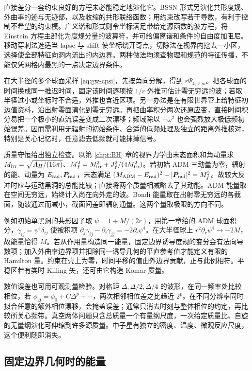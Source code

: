 直接差分一套约束良好的方程未必能稳定地演化它。BSSN 形式另演化共形度规、外曲率的迹与无迹部，以及收缩的共形联络函数；用约束改写若干导数，有利于控制不希望的约束模。广义谐和形式则令坐标满足带给定源函数的波方程，将 Einstein 方程主部化为度规分量的波算符，并可给偏离谐和条件的自由度加阻尼。移动穿刺法选适当 lapse 与 shift 使坐标绕开奇点，切除法在视界内挖去一小区，选择使全部特征向洞内流出的内边界。两种做法均须查物理和规范的特征传播，不能仅凭网格内最黑的一点决定边界条件。

在大半径的多个球面采样 \eqref{eq:gw-cpsi}，先按角向分解，得到 $r\Psi_{4,\ell m}$。把各球面的时间换成同一推迟时间，固定该时间逐项按 $1/r$ 外推可估计零无穷远的波；若取半径过小或坐标时不合适，外推也含近区项。另一办法是在有限世界管上给特征初边值资料，沿出射零面演化到零无穷远。再把曲率积分两次还原应变，直接时间积分易把一个极小的直流误差变成二次漂移；频域除以 $-\omega^2$ 也会强烈放大极低频初始误差。因而需利用无辐射的初始条件、合适的低频处理及独立的距离外推核对，特别是关心记忆时，任意滤去低频就可能抹掉信号。

质量守恒给出独立检查。以第 \ref{chpt:BH} 章的视界力学由末态面积和角动量求 $M_{\rm irr}=\sqrt{A_H/(16\pi)}$、$M_f^2=M_{\rm irr}^2+J_f^2/(4M_{\rm irr}^2)$。若初始 ADM 三动量为零，辐射的能、动量为 $E_{\rm rad},\bm P_{\rm rad}$，末态满足 $(M_{\rm ADM}-E_{\rm rad})^2-|\bm P_{\rm rad}|^2=M_f^2$。故较大反冲时应与运动黑洞的总能比较；直接将两个质量相减略去了其动能。ADM 能量取在空间无穷远，始终计入尚在向外走的波。Bondi 能量取在出射零无穷远的各截面，随波通过而减小，截面间差即辐射通量。这两个量取极限的方向不同。

例如初始单黑洞的共形因子取 $\psi=1+M/(2r)$，用第一章给的 ADM 球面积分，$\gamma_{ij}=\psi^4\delta_{ij}$ 使被积项 $\partial_j\gamma_{ij}-\partial_i\gamma_{jj}=-2\partial_i\psi^4$。在大半径球上 $r^2\partial_r\psi^4\to-2M$，故能量恰得 $M$。若从作用量构造同一能量，固定边界诱导度规的变分会有法向导数项；加入外曲率边界项并扣除同一诱导几何的平直参考值才能定义有限的 Hamilton 量。约束在壳上为零，时间平移的值由外边界贡献，正与此例相符。平稳区若有类时 Killing 矢，还可由它构造 Komar 质量。

数值误差也可用可观测量检验。对格距 $\Delta,\Delta/2,\Delta/4$ 的波形，在同一频率处比较相位，若 $\phi_\Delta=\phi_0+C\Delta^p+\cdots$，两次相邻相位差之比趋近 $2^p$。在不同分辨率同时拟合任意的额外相位漂移，会掩盖误差；通常只消去时刻与整体相位的约定，再比较所关心频带。真空两体问题只含总质量一个有量纲尺度，一次给定质量比、自旋的无量纲演化可伸缩到许多源质量。中子星有独立的密度、温度、微观反应尺度，这个便利随即消失。

\subsection{固定边界几何时的能量}

